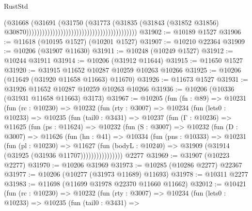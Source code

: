 \begin{lexlean}{RustStd}
\begin{coremodule}
                                                                            (@31668
                                                                              (@31691
                                                                                (@31750
                                                                                  (@31773
                                                                                    (@31835
                                                                                      (@31843
                                                                                        (@31852
                                                                                          @31856)
                                                                                        @30870))))))))))))))))))))))))))))))))))))))))))
@31902 := @10189 @1527
@31906 := @11618 (@10195 @1527) (@10201 @1527)
@31907 := @10210 @22364
@31909 := @10206 (@31907 @11630)
@31911 := @10248 (@10249 @1527)
@31912 := @10244 @31911
@31914 := @10206 (@31912 @11644)
@31915 := @11650 @1527
@31920 := @31915 @11652 @10287 @10259 @10263 @10266
@31925 := @10206 (@11649 (@31920 @11658 @11663) @11670)
@31926 := @11673 @1527
@31931 := @31926 @11652 @10287 @10259 @10263 @10266
@31936 := @10206 (@10336 (@31931 @11658 @11663) @3173)
@31967 := @10205
    (fun (fn : @89) =>
    @10231
      (fun (rc : @10230) =>
      @10232
        (fun (rty : @3007) =>
        @10234
          (fun (lets0 : @10233) =>
          @10235
            (fun (tail0 : @3431) =>
            @10237
              (fun (Γ : @10236) =>
              @11625
                (fun (ps : @11624) =>
                @10232
                  (fun (S : @3007) =>
                  @10232
                    (fun (D : @3007) =>
                    @11626
                      (fun (hn : @41) =>
                      @10334
                        (fun (pns : @10333) =>
                        @10231
                          (fun (pl : @10230) =>
                          @11627
                            (fun (bodyL : @10240) =>
                            @31909 (@31914 (@31925 (@31936 @11707))))))))))))))))
    @2277
@31969 := @31907 (@10223 @2277)
@31970 := @10206 @31969
@31973 := @10285 (@10286 @2277) @22367
@31977 := @10206 (@10277 (@31973 @11689) @11693)
@31978 := @10311 @2277
@31983 := @11698 (@11699 @31978 @22370 @11660 @11662)
@32012 := @10421
    (fun (rc : @10230) =>
    @10232
      (fun (rty : @3007) =>
      @10234
        (fun (lets0 : @10233) =>
        @10235
          (fun (tail0 : @3431) =>

\end{coremodule}
\end{lexlean}
